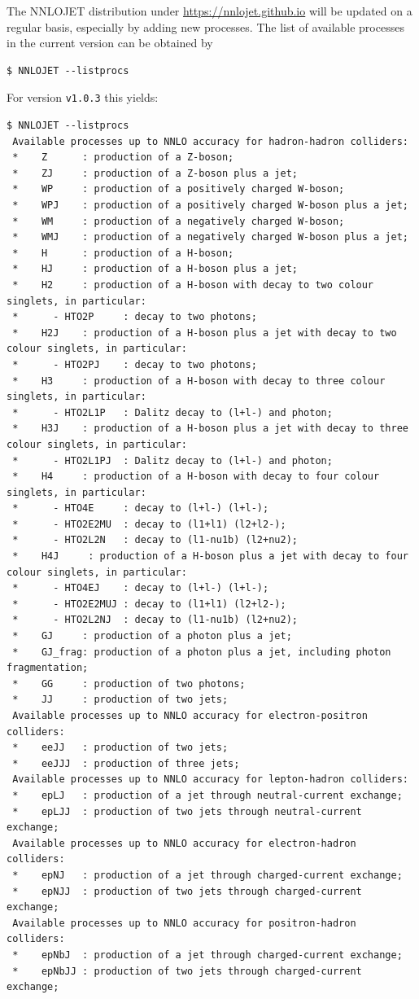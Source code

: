 \documentclass{SciPost}
\newcommand{\myurl}[1]{\href{#1}{#1}}
\begin{document}
The NNLOJET distribution under \myurl{https://nnlojet.github.io} will be updated on a regular basis, especially by
adding new processes. The list of available processes in the current version can be obtained
by
\begin{lstlisting}[language=commands]
$ NNLOJET --listprocs
\end{lstlisting}
For version \texttt{v1.0.3} this yields:
\begin{lstlisting}[language=commands,basicstyle=\tiny\ttfamily]
 $ NNLOJET --listprocs
 Available processes up to NNLO accuracy for hadron-hadron colliders:
 *    Z      : production of a Z-boson;
 *    ZJ     : production of a Z-boson plus a jet;
 *    WP     : production of a positively charged W-boson;
 *    WPJ    : production of a positively charged W-boson plus a jet;
 *    WM     : production of a negatively charged W-boson;
 *    WMJ    : production of a negatively charged W-boson plus a jet;
 *    H      : production of a H-boson;
 *    HJ     : production of a H-boson plus a jet;
 *    H2     : production of a H-boson with decay to two colour singlets, in particular:
 *      - HTO2P     : decay to two photons;
 *    H2J    : production of a H-boson plus a jet with decay to two colour singlets, in particular:
 *      - HTO2PJ    : decay to two photons;
 *    H3     : production of a H-boson with decay to three colour singlets, in particular:
 *      - HTO2L1P   : Dalitz decay to (l+l-) and photon;
 *    H3J    : production of a H-boson plus a jet with decay to three colour singlets, in particular:
 *      - HTO2L1PJ  : Dalitz decay to (l+l-) and photon;
 *    H4     : production of a H-boson with decay to four colour singlets, in particular:
 *      - HTO4E     : decay to (l+l-) (l+l-);
 *      - HTO2E2MU  : decay to (l1+l1) (l2+l2-);
 *      - HTO2L2N   : decay to (l1-nu1b) (l2+nu2);
 *    H4J     : production of a H-boson plus a jet with decay to four colour singlets, in particular:
 *      - HTO4EJ    : decay to (l+l-) (l+l-);
 *      - HTO2E2MUJ : decay to (l1+l1) (l2+l2-);
 *      - HTO2L2NJ  : decay to (l1-nu1b) (l2+nu2);
 *    GJ     : production of a photon plus a jet;
 *    GJ_frag: production of a photon plus a jet, including photon fragmentation;
 *    GG     : production of two photons;
 *    JJ     : production of two jets;
 Available processes up to NNLO accuracy for electron-positron colliders:
 *    eeJJ   : production of two jets;
 *    eeJJJ  : production of three jets;
 Available processes up to NNLO accuracy for lepton-hadron colliders:
 *    epLJ   : production of a jet through neutral-current exchange;
 *    epLJJ  : production of two jets through neutral-current exchange;
 Available processes up to NNLO accuracy for electron-hadron colliders:
 *    epNJ   : production of a jet through charged-current exchange;
 *    epNJJ  : production of two jets through charged-current exchange;
 Available processes up to NNLO accuracy for positron-hadron colliders:
 *    epNbJ  : production of a jet through charged-current exchange;
 *    epNbJJ : production of two jets through charged-current exchange;
\end{lstlisting}
\end{document}
